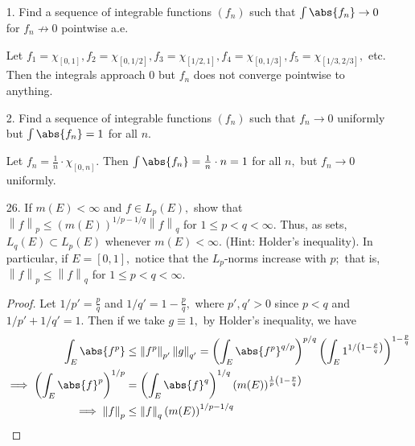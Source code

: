 \documentclass{article}
\begin{document}
\begin{itemize}
	\item[1.] Find a sequence of integrable functions $(f_n)$ such that $\int \abs{f_n}\to 0$ for $f_n\not\to 0$ pointwise a.e.
		\begin{soln}
			Let $f_1 = \chi_{[0, 1]}, f_2=\chi_{[0, 1/2]}, f_3=\chi_{[1/2, 1]}, f_4=\chi_{[0, 1/3]}, f_5=\chi_{[1/3, 2/3]},$ etc. Then the integrals approach 0 but $f_n$ does not converge pointwise to anything. 
		\end{soln}

	\item[2.] Find a sequence of integrable functions $(f_n)$ such that $f_n\to0$ uniformly but $\int\abs{f_n}=1$ for all $n.$
		\begin{soln}
			Let $f_n=\frac{1}{n}\cdot \chi_{[0, n]}.$ Then $\int\abs{f_n}= \frac{1}{n}\cdot n = 1$ for all $n,$ but $f_n\to 0$ uniformly.
		\end{soln}

	\item[26.] If $m(E)<\infty$ and $f\in L_p(E),$ show that $\left\lVert f \right\rVert_p\le \left( m(E) \right)^{1/p - 1/q}\left\lVert f \right\rVert_q$ for $1\le p<q<\infty.$ Thus, as sets, $L_q(E)\subset L_p(E)$ whenever $m(E)<\infty.$ (Hint: Holder's inequality). In particular, if $E=[0, 1],$ notice that the $L_p$-norms increase with $p;$ that is, $\left\lVert f \right\rVert_p\le \left\lVert f \right\rVert_q$ for $1\le p<q<\infty.$
		\begin{proof}
			Let $1/p'=\frac{p}{q}$ and $1/q'=1-\frac{p}{q},$ where $p', q'>0$ since $p<q$ and $1/p'+1/q'=1.$ Then if we take $g\equiv 1,$ by Holder's inequality, we have
			\begin{align*}
				\int_E\abs{f^{p}} &\le \left\lVert f^{p} \right\rVert_{p'} \left\lVert g \right\rVert_{q'} = \left( \int_E \abs{f^{p}}^{q/p} \right)^{p/q} \left( \int_E 1^{1/\left(1-\frac{p}{q}\right)} \right)^{ 1-\frac{p}{q}} \\ 
				\implies \left( \int_E \abs{f}^p \right)^{1/p} &= \left( \int_E \abs{f}^q \right)^{1/q} \left( m(E) \right)^{\frac{1}{p} \left( 1-\frac{p}{q} \right)} \\
				\implies \left\lVert f \right\rVert_p &\le \left\lVert f \right\rVert_q \left( m(E) \right)^{1/p-1/q}
			\end{align*}
		\end{proof}


\end{itemize}
\end{document}
